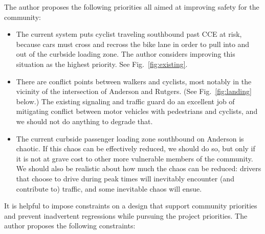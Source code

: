 \documentclass[12pt]{article}
\begin{document}
The author proposes the following priorities all aimed at improving
safety for the community:
\begin{itemize}

\item The current system puts cyclist traveling southbound past CCE at
  risk, because cars must cross and recross the bike lane in order to
  pull into and out of the curbside loading zone.  The author
  considers improving this situation as the highest priority.  See
  Fig.~\ref{fig:existing}.
  
\item There are conflict points between walkers and cyclists, most
  notably in the vicinity of the intersection of Anderson and Rutgers.
  (See Fig.~\ref{fig:landing} below.)  The existing signaling and traffic
  guard do an excellent job of mitigating conflict between motor
  vehicles with pedestrians and cyclists, and we should not do
  anything to degrade that.

\item The current curbside passenger loading zone southbound on
  Anderson is chaotic.  If this chaos can be effectively reduced, we
  should do so, but only if it is not at grave cost to other more
  vulnerable members of the community.  We should also be realistic
  about how much the chaos can be reduced: drivers that choose to
  drive during peak times will inevitably encounter (and contribute
  to) traffic, and some inevitable chaos will ensue.

\end{itemize}
It is helpful to impose constraints on a design that support community
priorities and prevent inadvertent regressions while pursuing the
project priorities.  The author proposes the following constraints:
\end{document}
